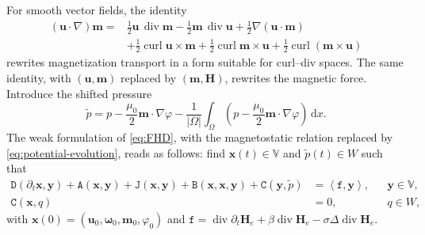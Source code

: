 \documentclass[11pt,a4paper]{article}
\newcommand{\bs}{\boldsymbol}
\newcommand{\dd}{\,\mathrm d}
\DeclareMathOperator{\curl}{curl}
\DeclareMathOperator{\ddiv}{div}
\newcommand{\Div}{\ddiv}
\newcommand{\V}{\mathbb V}
\newcommand{\DD}{\mathtt D}
\newcommand{\Aform}{\mathtt A}
\newcommand{\JJ}{\mathtt J}
\newcommand{\BB}{\mathtt B}
\newcommand{\CC}{\mathtt C}
\newcommand{\ff}{\mathtt f}
\newcommand{\pp}{\widetilde p}
\newcommand{\dual}[2]{\left\langle#1,#2\right\rangle}
\theoremstyle{definition}
\numberwithin{equation}{section}
\begin{document}
For smooth vector fields, the identity
\begin{equation}\label{eq:vector-identity}
\begin{aligned}
 (\bs u\cdot\nabla)\bs m={}&\frac12\bs u\,\Div\bs m-\frac12\bs m\,\Div\bs u
 +\frac12\nabla(\bs u\cdot\bs m)\\
 &+\frac12\curl\bs u\times\bs m+\frac12\curl\bs m\times\bs u
 +\frac12\curl(\bs m\times\bs u)
\end{aligned}
\end{equation}
rewrites magnetization transport in a form suitable for curl--div spaces. The same identity, with $(\bs u,\bs m)$ replaced by $(\bs m,\bs H)$, rewrites the magnetic force. Introduce
the shifted pressure 
\begin{equation}\label{eq:shifted-pressure}
 \pp=p-\frac{\mu_0}{2}\bs m\cdot\nabla\varphi
 -\frac1{|\Omega|}\int_\Omega\left(p-\frac{\mu_0}{2}\bs m\cdot\nabla\varphi\right)\dd x.
\end{equation}
The weak formulation of \eqref{eq:FHD}, with the magnetostatic relation replaced by \eqref{eq:potential-evolution}, reads as follows:
find $\bs x(t)\in\V$ and $\pp(t)\in W$ such that
\begin{equation}\label{eq:abstract}
\begin{aligned}
 \DD(\partial_t\bs x,\bs y)+\Aform(\bs x,\bs y)+\JJ(\bs x,\bs y)
 +\BB(\bs x,\bs x,\bs y)+\CC(\bs y,\pp)&=\dual{\ff}{\bs y},&&\bs y\in\V,\\
 \CC(\bs x,q)&=0,&&q\in W,
\end{aligned}
\end{equation}
with $\bs x(0)=(\bs u_0,\bs\omega_0,\bs m_0,\varphi_0)$ and $\ff = \Div\partial_t\bs H_e + \beta \Div\bs H_e - \sigma\Delta \Div\bs H_e$. 
\end{document}
